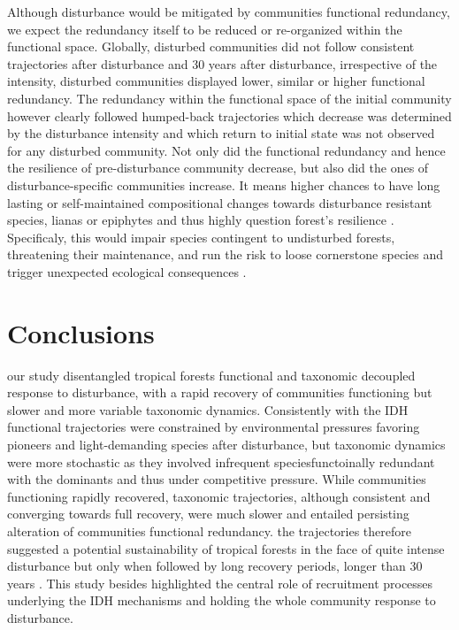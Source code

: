 \documentclass[fleqn,10pt]{ArtEcoFoG} %
\theoremstyle{definition}
\theoremstyle{definition}
\theoremstyle{definition}
\theoremstyle{remark}
\begin{document}
Although disturbance would be mitigated by communities functional
redundancy, we expect the redundancy itself to be reduced or
re-organized within the functional space. Globally, disturbed
communities did not follow consistent trajectories after disturbance and
30 years after disturbance, irrespective of the intensity, disturbed
communities displayed lower, similar or higher functional redundancy.
The redundancy within the functional space of the initial community
however clearly followed humped-back trajectories which decrease was
determined by the disturbance intensity and which return to initial
state was not observed for any disturbed community. Not only did the
functional redundancy and hence the resilience of pre-disturbance
community decrease, but also did the ones of disturbance-specific
communities increase. It means higher chances to have long lasting or
self-maintained compositional changes towards disturbance resistant
species, lianas or epiphytes \citep{Haddad2008, Burslem2000, Martin2013}
and thus highly question forest's resilience \citep{Chazdon2003a}.
Specificaly, this would impair species contingent to undisturbed
forests, threatening their maintenance, and run the risk to loose
cornerstone species and trigger unexpected ecological consequences
\citep{Jones1994, Diaz2005, Gardner2007}.

\section{Conclusions}\label{conclusions}

our study disentangled tropical forests functional and taxonomic
decoupled response to disturbance, with a rapid recovery of communities
functioning but slower and more variable taxonomic dynamics.
Consistently with the IDH functional trajectories were constrained by
environmental pressures favoring pioneers and light-demanding species
after disturbance, but taxonomic dynamics were more stochastic as they
involved infrequent speciesfunctoinally redundant with the dominants and
thus under competitive pressure. While communities functioning rapidly
recovered, taxonomic trajectories, although consistent and converging
towards full recovery, were much slower and entailed persisting
alteration of communities functional redundancy. the trajectories
therefore suggested a potential sustainability of tropical forests in
the face of quite intense disturbance but only when followed by long
recovery periods, longer than 30 years \citep{Gourlet-Fleury2005}. This
study besides highlighted the central role of recruitment processes
underlying the IDH mechanisms and holding the whole community response
to disturbance.
\end{document}
